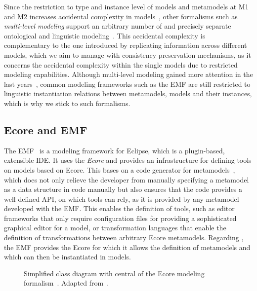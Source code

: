 Since the restriction to type and instance level of models and metamodels at M1 and M2 increases accidental complexity in models~\cite{atkinson2008reducingAccidentalComplexity-SoSym}, other formalisms such as \emph{multi-level modeling} support an arbitrary number of \metalevels and precisely separate ontological and linguistic modeling~\cite{atkinson2003mdd-Software}.
This accidental complexity is complementary to the one introduced by replicating information across different models, which we aim to manage with consistency preservation mechanisms, as it concerns the accidental complexity within the single models due to restricted modeling capabilities.
Although multi-level modeling gained more attention in the last years~\cite{atkinson2014multilevel-MLM}, common modeling frameworks such as the \acrlong{EMF} are still restricted to linguistic instantiation relations between metamodels, models and their instances, which is why we stick to such formalisms.


\subsection{Ecore and EMF}
\label{chap:foundations:formalisms:ecore}

The \gls{EMF}~\cite{steinberg2009emf} is a modeling framework for Eclipse, which is a plugin-based, extensible \gls{IDE}.
It uses the \metametamodel \emph{Ecore} and provides an infrastructure for defining tools on models based on Ecore.
This bases on a code generator for metamodels~\cite[pp.~237]{steinberg2009emf}, which does not only relieve the developer from manually specifying a metamodel as a data structure in code manually but also ensures that the code provides a well-defined \gls{API}, on which tools can rely, as it is provided by any metamodel developed with the \gls{EMF}.
This enables the definition of tools, such as editor frameworks that only require configuration files for providing a sophisticated graphical editor for a model, or transformation languages that enable the definition of transformations between arbitrary Ecore metamodels.
Regarding \metalevels, the \gls{EMF} provides the Ecore \metametamodel for which it allows the definition of metamodels and which can then be instantiated in models.

\begin{figure}
    \centering
    
    \caption[Relevant subset of the Ecore modeling formalism]{Simplified class diagram with central \metaclasses of the Ecore modeling formalism~\cite[p.~107]{steinberg2009emf}. Adapted from~\cite[Fig.~2.3]{kramer2017a}.}
    \label{fig:foundations:ecore}
\end{figure}

